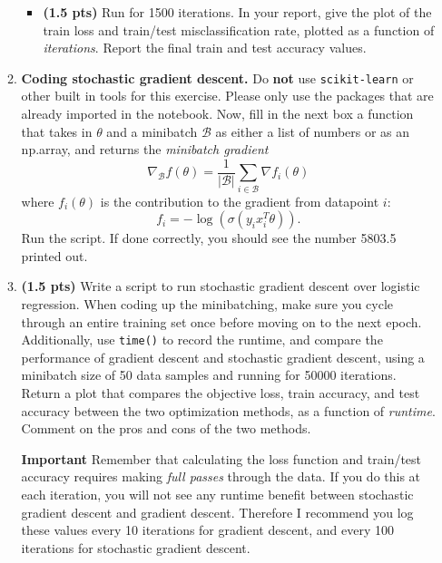 \documentclass{article}
\newcommand{\mB}{\mathcal B}
\newcommand{\showpoints}[1]{\textbf{(#1)}}
\begin{document}
\begin{enumerate}
\begin{enumerate}
\begin{itemize}
    \item \showpoints{1.5 pts} Run for 1500 iterations. In your report, give the plot of the train  loss and train/test misclassification rate, plotted as a function of \emph{iterations}. Report the final train and test accuracy values. 




\end{itemize}
 
\item \textbf{Coding stochastic gradient descent.} Do \textbf{not} use  \texttt{scikit-learn} or other built in tools for this exercise. Please only use the packages that are already imported in the notebook. Now, fill in the next box a function that takes in $\theta$ and a minibatch $\mathcal B$ as either a list of numbers or as an np.array, and returns the \emph{minibatch gradient}
\[
\nabla_\mB f(\theta) = \frac{1}{|\mB|}\sum_{i\in \mB} \nabla f_i(\theta)
\]
where $f_i(\theta)$ is the contribution to the gradient from datapoint $i$:
\[
f_i = -\log(\sigma(y_ix_i^T\theta)).
\]
Run the script. If done correctly, you should see the number 5803.5 printed out. 

\item \showpoints{1.5 pts} Write a script to run stochastic gradient descent over logistic regression. When coding up the minibatching, make sure you cycle through an entire training set once before moving on to the next epoch. Additionally, use \texttt{time()} to record the runtime, and compare the performance of gradient descent and stochastic gradient descent, using a minibatch size of 50 data samples and running for 50000 iterations. Return a plot that compares the objective loss, train accuracy, and test accuracy between the two optimization methods, as a function of \emph{runtime}. Comment on the pros and cons of the two methods.


\textbf{Important} Remember that calculating the loss function and train/test accuracy requires making \emph{full passes} through the data. If you do this at each iteration, you will not see any runtime benefit between stochastic gradient descent and gradient descent. Therefore I recommend you log these values every 10 iterations for gradient descent, and every 100 iterations for stochastic gradient descent. 




\end{enumerate}

\end{enumerate}
\end{document}
